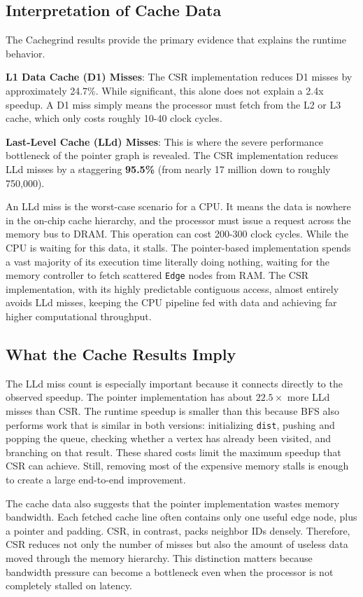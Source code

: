 \documentclass[11pt]{article}
\begin{document}
\subsection{Interpretation of Cache Data}

The Cachegrind results provide the primary evidence that explains the runtime behavior. 

\textbf{L1 Data Cache (D1) Misses}: The CSR implementation reduces D1 misses by approximately 24.7\%. While significant, this alone does not explain a 2.4x speedup. A D1 miss simply means the processor must fetch from the L2 or L3 cache, which only costs roughly 10-40 clock cycles.

\textbf{Last-Level Cache (LLd) Misses}: This is where the severe performance bottleneck of the pointer graph is revealed. The CSR implementation reduces LLd misses by a staggering \textbf{95.5\%} (from nearly 17 million down to roughly 750,000). 

An LLd miss is the worst-case scenario for a CPU. It means the data is nowhere in the on-chip cache hierarchy, and the processor must issue a request across the memory bus to DRAM. This operation can cost 200-300 clock cycles. While the CPU is waiting for this data, it stalls. The pointer-based implementation spends a vast majority of its execution time literally doing nothing, waiting for the memory controller to fetch scattered \texttt{Edge} nodes from RAM. The CSR implementation, with its highly predictable contiguous access, almost entirely avoids LLd misses, keeping the CPU pipeline fed with data and achieving far higher computational throughput.

\subsection{What the Cache Results Imply}

The LLd miss count is especially important because it connects directly to the observed speedup. The pointer implementation has about $22.5\times$ more LLd misses than CSR. The runtime speedup is smaller than this because BFS also performs work that is similar in both versions: initializing \texttt{dist}, pushing and popping the queue, checking whether a vertex has already been visited, and branching on that result. These shared costs limit the maximum speedup that CSR can achieve. Still, removing most of the expensive memory stalls is enough to create a large end-to-end improvement.

The cache data also suggests that the pointer implementation wastes memory bandwidth. Each fetched cache line often contains only one useful edge node, plus a pointer and padding. CSR, in contrast, packs neighbor IDs densely. Therefore, CSR reduces not only the number of misses but also the amount of useless data moved through the memory hierarchy. This distinction matters because bandwidth pressure can become a bottleneck even when the processor is not completely stalled on latency.
\end{document}
